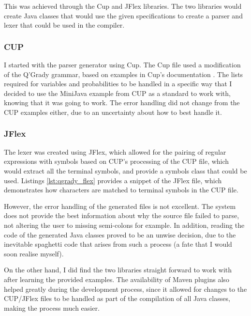 \documentclass[report.tex]{subfiles}
\begin{document}
This was achieved through the Cup and JFlex libraries. The two libraries would
create Java classes that would use the given specifications to create a parser
and lexer that could be used in the compiler.

\subsubsection{CUP} %
\label{ssub:cup}
I started with the parser generator using Cup. The Cup file used a modification
of the Q'Grady grammar, based on examples in Cup's documentation 
\cite{cup_example}. The lists required for variables and probabilities to be
handled in a specific way that I decided to use the MiniJava example from CUP
as a standard to work with, knowing that it was going to work. The error
handling did not change from the CUP examples either, due to an uncertainty
about how to best handle it.

\subsubsection{JFlex} %
\label{ssub:jflex}
The lexer was created using JFlex, which allowed for the pairing of regular
expressions with symbols based on CUP's processing of the CUP file, which would
extract all the terminal symbols, and provide a symbols class that could be
used. Listings \ref{lst:qgrady_flex} provides a snippet of the JFlex file, which
demonstrates how characters are matched to terminal symbols in the CUP file.

 


However, the error handling of the generated files is not excellent. The system
does not provide the best information about why the source file failed to parse,
not altering the user to missing semi-colons for example. In addition, reading
the code of the generated Java classes proved to be an unwise decision, due to
the inevitable spaghetti code that arises from such a process (a fate that I
would soon realise myself).

On the other hand, I did find the two libraries straight forward to work with
after learning the provided examples. The availability of Maven plugins also
helped greatly during the development process, since it allowed for changes to
the CUP/JFlex files to be handled as part of the compilation of all Java
classes, making the process much easier.
\end{document}
